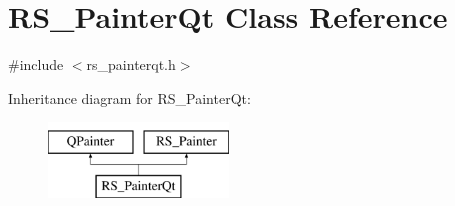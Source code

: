 \hypertarget{classRS__PainterQt}{\section{R\-S\-\_\-\-Painter\-Qt Class Reference}
\label{classRS__PainterQt}
}


{\ttfamily \#include $<$rs\-\_\-painterqt.\-h$>$}

Inheritance diagram for R\-S\-\_\-\-Painter\-Qt\-:\begin{figure}[H]
\begin{center}
\leavevmode
\includegraphics[height=2.000000cm]{classRS__PainterQt}
\end{center}
\end{figure}
